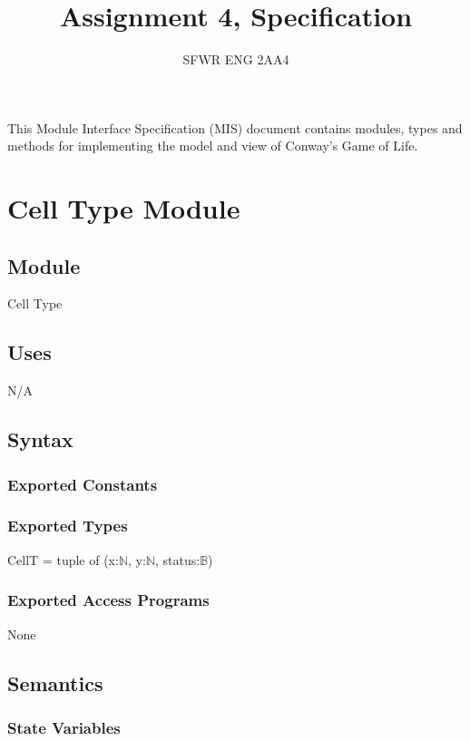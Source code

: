 \documentclass[12pt]{article}
\title{Assignment 4, Specification}
\author{SFWR ENG 2AA4}
\begin{document}
\maketitle
This Module Interface Specification (MIS) document contains modules, types and
methods for implementing the model and view of Conway's Game of Life.

\newpage

\section* {Cell Type Module}

\subsection*{Module}

Cell Type

\subsection* {Uses}

N/A

\subsection* {Syntax}

\subsubsection* {Exported Constants}

\subsubsection* {Exported Types}

CellT = tuple of (x:$\mathbb{N}$, y:$\mathbb{N}$, status:$\mathbb{B}$)

\subsubsection* {Exported Access Programs}

None

\subsection* {Semantics}

\subsubsection* {State Variables}
\end{document}

